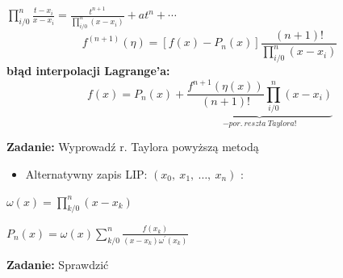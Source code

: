  \begin{frame}
 

$\displaystyle \prod_{i/0}^{n}\frac{t-x_{i}}{x-x_{i}}=\frac{t^{n+1}}{\prod_{i/0}^{n}(x-x_{i})}+at^{n}+\cdots$
$$
f^{(n+1)}(\eta)=[f(x)-P_{n}(x)]\frac{(n+1)!}{\prod_{i/0}^{n}(x-x_{i})}
$$
\textbf{błąd interpolacji Lagrange'a:}
$$
f(x)=P_{n}(x)+\underbrace{\frac{f^{n+1}(\eta(x))}{(n+1)!}\prod_{i/0}^{n}(x-x_{i})}_{- por.\: reszta\: Taylora!}
$$


\textbf{Zadanie:} Wyprowadź r. Taylora powyższą metodą \\
\end{frame}

\begin{frame}
\begin{itemize}
\item Alternatywny zapis LIP: $(x_{0},\ x_{1},\ \ldots,\ x_{n})$ :
\end{itemize}
$\displaystyle \omega(x)=\prod_{k/0}^{n}(x-x_{k})$

$P_{n}(x)=\displaystyle \omega(x)\sum_{k/0}^{n}\frac{f(x_{k})}{(x-x_{k})\omega ^{'}(x_{k})}$ \\
\vspace{5mm}

\textbf{Zadanie:} Sprawdzić
 
 \end{frame}
